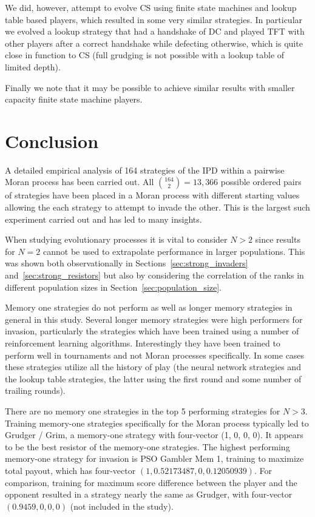 \documentclass{article}
\begin{document}
We did, however, attempt to evolve CS using finite state machines and lookup table
based players,
which resulted in some very similar strategies. In particular we evolved a
lookup strategy that had a handshake of DC and played TFT with other players
after a correct handshake while defecting otherwise, which is quite close in
function to CS (full grudging is not possible with a lookup table of limited
depth).

Finally we note that it may be possible to achieve similar results with smaller
capacity finite state machine players.

\section{Conclusion}\label{sec:conclusion}

A detailed empirical analysis of 164 strategies of the IPD within a pairwise
Moran process has been carried out. All \(\binom{164}{2}=13,366\) possible
ordered pairs of strategies have been placed in a Moran process with different
starting values allowing the each strategy to attempt to invade the other.
This is the largest such experiment carried out and has led to many insights.

When studying evolutionary processes it is vital to consider \(N>2\) since
results for \(N=2\) cannot be used to extrapolate performance in larger
populations. This was shown both observationally in
Sections~\ref{sec:strong_invaders} and~\ref{sec:strong_resistors} but also by
considering the correlation of the ranks in different population sizes in
Section~\ref{sec:population_size}.

Memory one strategies do not perform as well as longer memory strategies in general
in this study. Several longer memory strategies were high performers for invasion,
particularly the strategies which have been trained using a number of reinforcement
learning algorithms. Interestingly they have been trained to perform well in
tournaments and not Moran processes specifically. In some cases these strategies
utilize all the history of play (the neural network strategies and the lookup
table strategies, the latter using the first round and some number of trailing rounds).

There are no memory one strategies in the top 5 performing strategies
for \(N>3\). Training memory-one strategies specifically for the Moran process
typically led to Grudger / Grim, a memory-one strategy with
four-vector (1, 0, 0, 0). It appears to be the best resistor of the memory-one strategies.
The highest performing memory-one strategy for invasion is PSO Gambler Mem 1,
training to maximize total payout, which has four-vector $(1, 0.52173487, 0, 0.12050939)$.
For comparison, training for maximum score difference between the player and the
opponent resulted in a strategy nearly the same as Grudger, with four-vector
$(0.9459, 0, 0, 0)$ (not included in the study).
\end{document}
